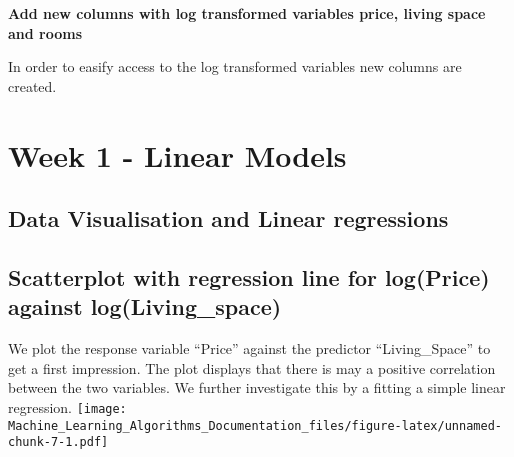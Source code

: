 \documentclass[
]{article}
\newenvironment{Shaded}{\begin{snugshade}}{\end{snugshade}}
\newcommand{\KeywordTok}[1]{\textcolor[rgb]{0.13,0.29,0.53}{\textbf{#1}}}
\newcommand{\NormalTok}[1]{#1}
\newcommand{\OperatorTok}[1]{\textcolor[rgb]{0.81,0.36,0.00}{\textbf{#1}}}
\newcommand{\StringTok}[1]{\textcolor[rgb]{0.31,0.60,0.02}{#1}}
\begin{document}
\textbf{Add new columns with log transformed variables price, living
space and rooms}

In order to easify access to the log transformed variables new columns
are created.

\begin{Shaded}
\end{Shaded}

\hypertarget{week-1---linear-models}{%
\section{Week 1 - Linear Models}\label{week-1---linear-models}}

\hypertarget{data-visualisation-and-linear-regressions}{%
\subsection{Data Visualisation and Linear
regressions}\label{data-visualisation-and-linear-regressions}}

\hypertarget{scatterplot-with-regression-line-for-logprice-against-logliving_space}{%
\subsection{Scatterplot with regression line for log(Price) against
log(Living\_space)}\label{scatterplot-with-regression-line-for-logprice-against-logliving_space}}

We plot the response variable ``Price'' against the predictor
``Living\_Space'' to get a first impression. The plot displays that
there is may a positive correlation between the two variables. We
further investigate this by a fitting a simple linear regression.
\texttt{[image: Machine\_Learning\_Algorithms\_Documentation\_files/figure-latex/unnamed-chunk-7-1.pdf]}
\end{document}
